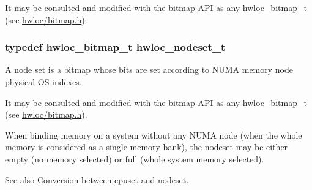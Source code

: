 It may be consulted and modified with the bitmap API as any \hyperlink{a00065_gaa3c2bf4c776d603dcebbb61b0c923d84}{hwloc\_\-bitmap\_\-t} (see \hyperlink{a00027_source}{hwloc/bitmap.h}). \hypertarget{a00040_ga37e35730fa7e775b5bb0afe893d6d508}{
\subsubsection[{hwloc\_\-nodeset\_\-t}]{\setlength{\rightskip}{0pt plus 5cm}typedef {\bf hwloc\_\-bitmap\_\-t} {\bf hwloc\_\-nodeset\_\-t}}}
\label{a00040_ga37e35730fa7e775b5bb0afe893d6d508}


A node set is a bitmap whose bits are set according to NUMA memory node physical OS indexes. 

It may be consulted and modified with the bitmap API as any \hyperlink{a00065_gaa3c2bf4c776d603dcebbb61b0c923d84}{hwloc\_\-bitmap\_\-t} (see \hyperlink{a00027_source}{hwloc/bitmap.h}).

When binding memory on a system without any NUMA node (when the whole memory is considered as a single memory bank), the nodeset may be either empty (no memory selected) or full (whole system memory selected).

See also \hyperlink{a00062}{Conversion between cpuset and nodeset}. 